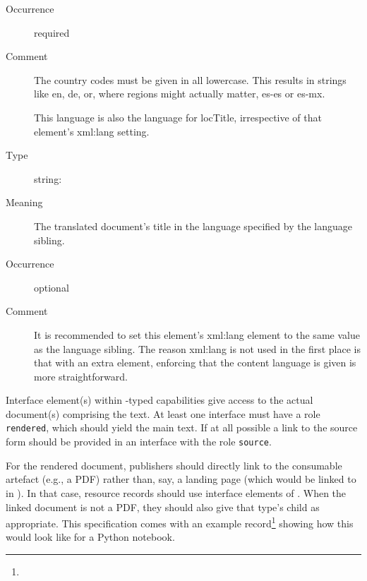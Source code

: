\documentclass{ivoa}
\begin{document}
\begin{generated}
\begin{bigdescription}
\begin{description}
\item[Occurrence] required
\item[Comment]
                The country codes must be given in all lowercase.  This
                results in strings like en, de, or, where regions
                might actually matter, es-es or es-mx.

                This language is also the language for locTitle,
                irrespective of that element's xml:lang setting.


\end{description}
\item[Element \xmlel{locTitle}]
\begin{description}
\item[Type] string: 
\item[Meaning]
                The translated document's title in the language specified
                by the language sibling.

\item[Occurrence] optional
\item[Comment]
                It is recommended to set this element's xml:lang element
                to the same value as the language sibling.  The reason
                xml:lang is not used in the first place is that with an
                extra element, enforcing that the content language is
                given is more straightforward.


\end{description}


\end{bigdescription}\endgroup

\endgroup
\end{generated}


Interface element(s) within -typed capabilities give
access to the actual document(s) comprising the text.  At least one
interface must have a role \verb|rendered|, which should yield the main
text.  If at all possible a link to the source form should be provided
in an interface with the role \verb|source|.

For the rendered document, publishers should directly link to the
consumable artefact (e.g., a PDF) rather than, say, a landing page
(which would be linked to in ).  In that case,
resource records should use interface elements of
.  When the linked document is not a PDF, they
should also give that type's  child as appropriate.
This specification comes with an example
record\footnote{} showing how this
would look like for a Python notebook.
\end{document}
